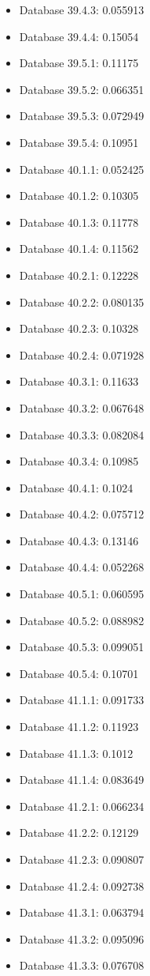 \begin{itemize}
\item Database 39.4.3: 0.055913
\item Database 39.4.4: 0.15054
\item Database 39.5.1: 0.11175
\item Database 39.5.2: 0.066351
\item Database 39.5.3: 0.072949
\item Database 39.5.4: 0.10951
\item Database 40.1.1: 0.052425
\item Database 40.1.2: 0.10305
\item Database 40.1.3: 0.11778
\item Database 40.1.4: 0.11562
\item Database 40.2.1: 0.12228
\item Database 40.2.2: 0.080135
\item Database 40.2.3: 0.10328
\item Database 40.2.4: 0.071928
\item Database 40.3.1: 0.11633
\item Database 40.3.2: 0.067648
\item Database 40.3.3: 0.082084
\item Database 40.3.4: 0.10985
\item Database 40.4.1: 0.1024
\item Database 40.4.2: 0.075712
\item Database 40.4.3: 0.13146
\item Database 40.4.4: 0.052268
\item Database 40.5.1: 0.060595
\item Database 40.5.2: 0.088982
\item Database 40.5.3: 0.099051
\item Database 40.5.4: 0.10701
\item Database 41.1.1: 0.091733
\item Database 41.1.2: 0.11923
\item Database 41.1.3: 0.1012
\item Database 41.1.4: 0.083649
\item Database 41.2.1: 0.066234
\item Database 41.2.2: 0.12129
\item Database 41.2.3: 0.090807
\item Database 41.2.4: 0.092738
\item Database 41.3.1: 0.063794
\item Database 41.3.2: 0.095096
\item Database 41.3.3: 0.076708

\end{itemize}

